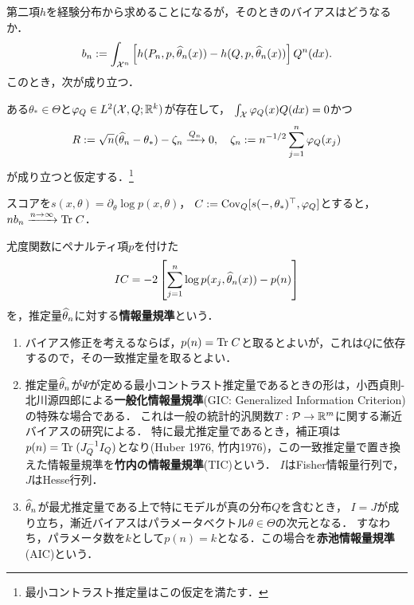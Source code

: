 \documentclass[uplatex,dvipdfmx]{jsreport}
\begin{document}
\begin{discussion}[バイアスの推定]
    第二項$h$を経験分布から求めることになるが，そのときのバイアスはどうなるか．
    \[b_n:=\int_{\mathcal{X}^n}\left[h(P_n,p,\widehat{\theta}_n(x))-h(Q,p,\widehat{\theta}_n(x))\right]Q^n(dx).\]
    このとき，次が成り立つ．
\end{discussion}

\begin{theorem}
    ある$\theta_*\in\Theta$と$\varphi_Q\in L^2(\mathcal{X},Q;\mathbb{R}^k)$が存在して，
    $\int_{\mathcal{X}}\varphi_Q(x)Q(dx)=0$かつ
    \[R:=\sqrt{n}(\widehat{\theta}_n-\theta_*)-\zeta_n\xrightarrow{Q_n}0,\quad\zeta_n:=n^{-1/2}\sum_{j=1}^n\varphi_Q(x_j)\]
    が成り立つと仮定する．\footnote{最小コントラスト推定量はこの仮定を満たす．}

    スコアを$s(x,\theta)=\partial_\theta\log p(x,\theta)$，
    $C:=\mathrm{Cov}_Q[s(-,\theta_*)^\top,\varphi_Q]$とすると，
    $nb_n\xrightarrow{n\to\infty}\mathrm{Tr}\; C$．
\end{theorem}

\begin{definition}
    尤度関数にペナルティ項$p$を付けた
    \[IC=-2\left[\sum^n_{j=1}\log p(x_j,\widehat{\theta}_n(x))-p(n)\right]\]
    を，推定量$\widehat{\theta}_n$に対する\textbf{情報量規準}という．
\end{definition}

\begin{example}\mbox{}
    \begin{enumerate}
        \item バイアス修正を考えるならば，$p(n)=\mathrm{Tr}\; C$と取るとよいが，これは$Q$に依存するので，その一致推定量を取るとよい．
        \item 推定量$\widehat{\theta}_n$が$\Psi$が定める最小コントラスト推定量であるときの形は，小西貞則-北川源四郎による\textbf{一般化情報量規準}(GIC: Generalized Information Criterion)の特殊な場合である．
        これは一般の統計的汎関数$T:\mathcal{P}\to\mathbb{R}^m$に関する漸近バイアスの研究による．
        特に最尤推定量であるとき，補正項は$p(n)=\mathrm{Tr}\;(J_Q^{-1}I_Q)$となり(Huber 1976, 竹内1976)，この一致推定量で置き換えた情報量規準を\textbf{竹内の情報量規準}(TIC)という．
        $I$はFisher情報量行列で，$J$はHesse行列．
        \item $\widehat{\theta}_n$が最尤推定量である上で特にモデルが真の分布$Q$を含むとき，
        $I=J$が成り立ち，漸近バイアスはパラメータベクトル$\theta\in\Theta$の次元となる．
        すなわち，パラメータ数を$k$として$p(n)=k$となる．この場合を\textbf{赤池情報量規準}(AIC)という．
    \end{enumerate}
\end{example}
\end{document}

